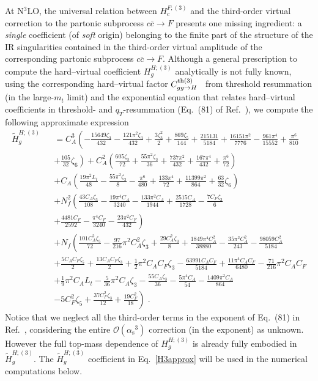 \documentclass[12pt]{article}
\def\beeq{\begin{eqnarray}}
\def\eeeq{\end{eqnarray}}
\def\nn{\nonumber}
\DeclareRobustCommand{\as}{\ensuremath{\alpha_{\mathrm{s}}}}
\newcommand\f[2]{\frac{#1}{#2}}
\def\to{\rightarrow}
\DeclareRobustCommand{\qt}{q_T}
\begin{document}
At N$^{3}$LO, the universal relation between $H^{F;(3)}_{c}$ and the third-order virtual correction to the partonic subprocess $c{\bar c}\to F$ presents one missing ingredient: a {\em single} coefficient (of {\em soft} origin) belonging to the finite part of the structure of the IR singularities contained in the
third-order virtual amplitude of the corresponding partonic subprocess $c{\bar c}\to F$. Although a general prescription to compute the hard--virtual coefficient $H^{H;(3)}_{g}$ analytically is not fully known, using the corresponding hard--virtual factor $C^{{\rm th}(3)}_{gg\to H}$~\cite{Catani:2014uta} from threshold resummation (in the large-$m_t$ limit) and the exponential equation that relates hard--virtual coefficients in threshold- and $\qt$-resummation (Eq.~(81) of Ref.~\cite{Catani:2013tia}), we compute the following approximate expression
\beeq
\label{H3approx}
\widetilde{H}^{H;(3)}_{g}&&\!\!\!\!\!\!\!\!=C_{A}^{3}\left(-\frac{15649 \zeta_{3}}{432}-\frac{121 \pi ^2 \zeta_{3}}{432}+\frac{3
   \zeta_{3}^2}{2}+\frac{869 \zeta_{ 5}}{144}+\frac{215131}{5184}+\frac{16151 \pi ^2}{7776}-\frac{961
   \pi ^4}{15552}+\frac{\pi ^6}{810}\right.\nn\\
   &&\left.+\f{105}{32} \zeta_{6}\right)
  +  C_{A}^{2}\left(\frac{605 \zeta_{ 3}}{72}+\frac{55 \pi ^2 \zeta_{ 3}}{36}+\frac{737 \pi ^2}{432}+\frac{167 \pi ^4}{432}+\frac{\pi
   ^6}{72}   \right) \nn\\
   &&+ C_{A}\left( \frac{19 \pi ^2  L_{t}}{48}-\frac{55 \pi ^2 \zeta _{3}}{8}-\frac{\pi ^6}{480}+\frac{133 \pi ^4}{72}+\frac{11399
   \pi ^2}{864}  + \f{63}{32} \zeta_{6}    \right)\nn\\
   && + N_{f}^{2} \left( \frac{43 C_{A} \zeta_{ 3}}{108}-\frac{19 \pi ^4 C_{A}}{3240}-\frac{133 \pi ^2 C_{A}}{1944}+\frac{2515
   C_{A}}{1728}-\frac{7 C_{F} \zeta_{ 3}}{6}\right. \nn\\
   &&+\left. \frac{4481 C_{F}}{2592}-\frac{\pi ^4
   C_{F}}{3240}-\frac{23 \pi ^2 C_{F}}{432} \right)\nn\\
   && + N_{f} \left(
    \frac{101 C_{A}^2 \zeta_{5}}{72}-\frac{97}{216} \pi ^2 C_{A}^2 \zeta_{3}+\frac{29 C_{A}^2 \zeta_{3}}{8}+\frac{1849 \pi ^4 C_{A}^2}{38880}-\frac{35 \pi ^2 C_{A}^2}{243}-\frac{98059
  C_{A}^2}{5184}\right.\nn\\
   &&+\frac{5 C_{A} C_{F} \zeta _{5}}{2}+\frac{13 C_{A} C_{F} \zeta
   _{3}}{2}+\frac{1}{2} \pi ^2 C_{A} C_{F} \zeta _{3}-\frac{63991 C_{A} C_{F}}{5184}+\frac{11 \pi ^4
   C_{A} C_{F}}{6480}-\frac{71}{216} \pi ^2 C_{A} C_{F}\nn\\
   &&+\frac{1}{9} \pi ^2 C_{A}
   L_{t}-\frac{5}{36} \pi ^2 C_{A} \zeta _{3}-\frac{55 C_{A} \zeta_{ 3}}{36}-\frac{5 \pi ^4
   C_{A}}{54}-\frac{1409 \pi ^2 C_{A}}{864}\nn\\
   && \left. -5 C_{F}^2 \zeta_{ 5}+\frac{37 C_{F}^2 \zeta
   _{3}}{12}+\frac{19 C_{F}^2}{18}\right)\;.
\eeeq
Notice that we neglect all the third-order terms in the exponent of Eq.~(81) in Ref.~\cite{Catani:2013tia}, considering the entire $\mathcal{O}(\as^{3})$ correction (in the exponent) as unknown. However the full top-mass dependence of $H^{H;(3)}_g$ is already fully embodied in $\widetilde{H}^{H;(3)}_{g}$.
The $\widetilde{H}^{H;(3)}_{g}$ coefficient in Eq.~\eqref{H3approx} will be used in the numerical computations below.
\end{document}
